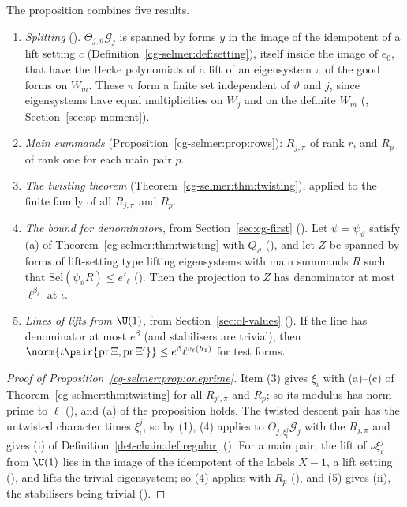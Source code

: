 The proposition combines five results.
\begin{enumerate}[label=(\arabic*)]
\item \emph{Splitting} ().
  $\Theta_{j,\vartheta}\mathcal G_j$ is spanned by forms $y$ in the image of the idempotent of a lift setting $c$
  (Definition~\ref{cg-selmer:def:setting}), itself inside the image of $e_0$, that have the Hecke
  polynomials of a lift of an eigensystem $\pi$ of the good forms on $W_m$. These $\pi$ form a finite set
  independent of $\vartheta$ and $j$, since eigensystems have equal multiplicities on $W_j$ and on
  the definite $W_m$ (,
  Section~\ref{sec:sp-moment}).
\item \emph{Main summands} (Proposition~\ref{cg-selmer:prop:rows}): $R_{j,\pi}$ of rank $r$, and $R_p$
  of rank one for each main pair $p$.
\item \emph{The twisting theorem} (Theorem~\ref{cg-selmer:thm:twisting}), applied to the finite
  family of all $R_{j,\pi}$ and $R_p$.
\item \emph{The bound for denominators}, from Section~\ref{sec:cg-first}
  (). Let $\psi=\psi_\vartheta$ satisfy (a) of
  Theorem~\ref{cg-selmer:thm:twisting} with $Q_\vartheta$ (), and let $Z$ be
  spanned by forms of lift-setting type lifting eigensystems with main summands $R$ such that
  $\mathrm{Sel}(\psi_\vartheta R)\le e'_\ell$ (). Then the
  projection to $Z$ has denominator at most $\ell^{\beta_\ell}$ at $\iota$.
\item \emph{Lines of lifts from $\U(1)$}, from Section~\ref{sec:ol-values}
  (). If the line has denominator at most
  $e^\beta$ (and stabilisers are trivial), then
  $\norm{\iota\pair{\mathrm{pr}\,\Xi,\mathrm{pr}\,\Xi'}}\le e^\beta\ell^{v_\ell(h_1)}$ for test forms.
\end{enumerate}

\begin{proof}[Proof of Proposition~\ref{cg-selmer:prop:oneprime}]
Item (3) gives $\xi_\iota$ with (a)--(c) of Theorem~\ref{cg-selmer:thm:twisting} for all $R_{j',\pi}$ and
$R_p$; so its modulus has norm prime to $\ell$ (),
and (a) of the proposition holds. The
twisted descent pair has the untwisted character times $\xi_\iota^j$, so by (1), (4) applies to
$\Theta_{j,\xi_\iota^j}\mathcal G_j$ with the $R_{j,\pi}$ and gives (i) of Definition~\ref{det-chain:def:regular}
(). For a main pair, the lift of $\nu\xi_\iota^j$ from
$\U(1)$ lies in the image of the idempotent of the labels $X-1$, a lift setting
(), and lifts the trivial eigensystem; so (4) applies with
$R_p$ (), and (5) gives (ii), the stabilisers being
trivial ().
\end{proof}

